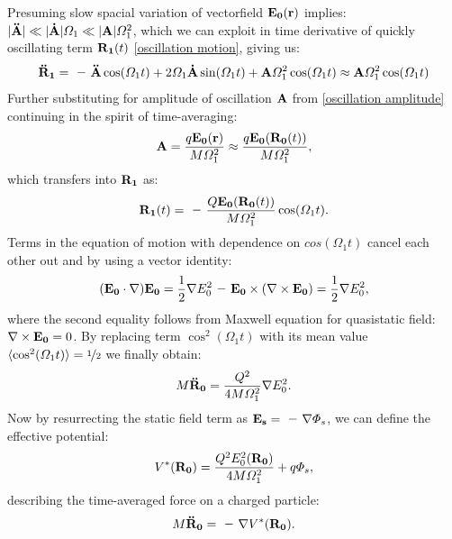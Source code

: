 Presuming slow spacial variation of vectorfield $\vb{E_0}(\vb{r})$ implies: \\ $|\vb{\ddot{A}}| \ll |\vb{\dot{A}}| \Omega_1 \ll |\vb{A}| \Omega_1^2$, which we can exploit in time derivative of quickly oscillating term $\vb{R_1}(t)$ \eqref{oscillation motion}, giving us:
\begin{equation}
	\vb{\ddot{R}_1} = \minus \vb{\ddot{A}} \cos(\Omega_1 t) + 2 \Omega_1 \vb{\dot{A}} \sin(\Omega_1 t) + \vb{A} \Omega_1^2 \cos(\Omega_1 t) \approx \vb{A} \Omega_1^2 \cos(\Omega_1 t)
\end{equation}
Further substituting for amplitude of oscillation $\vb{A}$ from \eqref{oscillation amplitude} continuing in the spirit of time-averaging:
\begin{equation}
	\vb{A} = \frac{q \vb{E_0}(\vb{r})}{M \Omega_1^2} \approx \frac{q \vb{E_0}(\vb{R_0}(t))}{M \Omega_1^2},
\end{equation}
which transfers into $\vb{R_1}$ as:
\begin{equation}
	\label{oscillation motion approx}
	\vb{R_1}(t) = \minus \frac{Q \vb{E_0}(\vb{R_0}(t))}{M \Omega_1^2} \cos(\Omega_1 t). 
\end{equation}
Terms in the equation of motion with dependence on $cos(\Omega_1 t)$ cancel each other out and by using a vector identity:
\begin{equation}
	\label{vector identity}
	(\vb{E_0} \cdot \nabla) \vb{E_0} = \frac{1}{2} \nabla E_0^2 \minus \vb{E_0} \times (\nabla \times \vb{E_0}) = \frac{1}{2} \nabla E_0^2,
\end{equation}
where the second equality follows from Maxwell equation for quasistatic field: \\ $\nabla \times \vb{E_0} = 0$. By replacing term $\cos^2(\Omega_1 t)$ with its mean value $\langle\cos^2(\Omega_1 t)\rangle = \nicefrac{1}{2}$ we finally obtain:
\begin{equation}
	M \vb{\ddot{R}_0} = \frac{Q^2}{4 M \Omega_1^2} \nabla E_0^2.
\end{equation}
Now by resurrecting the static field term as $\vb{E_s} = \minus \nabla \Phi_s$, we can define the effective potential:
\begin{equation}
	\label{effective potential}
	V^*(\vb{R_0}) = \frac{Q^2 E_0^2(\vb{R_0})}{4 M \Omega_1^2} + q \Phi_s, 
\end{equation}
describing the time-averaged force on a charged particle:
\begin{equation}
	\label{effective equation of motion}
	M \vb{\ddot{R}_0} = \minus \nabla V^*(\vb{R_0}). 
\end{equation}
